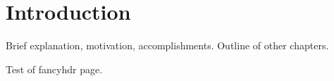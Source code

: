 \section{Introduction}

Brief explanation, motivation, accomplishments.  Outline of other chapters.

\newpage

Test of fancyhdr page.
